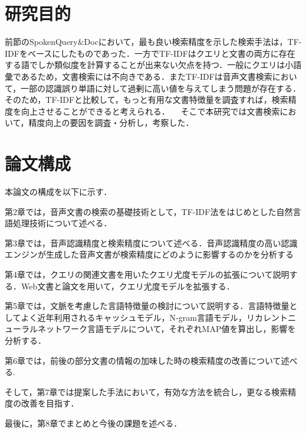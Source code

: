\section{研究目的}
前節のSpokenQuery\&Docにおいて，最も良い検索精度を示した検索手法は，TF-IDFをベースにしたものであった．一方でTF-IDFはクエリと文書の両方に存在する語でしか類似度を計算することが出来ない欠点を持つ．一般にクエリは小語彙であるため，文書検索には不向きである．またTF-IDFは音声文書検索において，一部の認識誤り単語に対して過剰に高い値を与えてしまう問題が存在する．そのため，TF-IDFと比較して，もっと有用な文書特徴量を調査すれば，検索精度を向上させることができると考えられる．
　そこで本研究では文書検索において，精度向上の要因を調査・分析し，考察した．

\section{論文構成}
\noindent
本論文の構成を以下に示す．

第2章では，音声文書の検索の基礎技術として，TF-IDF法をはじめとした自然言語処理技術について述べる．

第3章では，音声認識精度と検索精度について述べる．音声認識精度の高い認識エンジンが生成した音声文書が検索精度にどのように影響するのかを分析する 

第4章では，クエリの関連文書を用いたクエリ尤度モデルの拡張について説明する．Web文書と論文を用いて，クエリ尤度モデルを拡張する．

第5章では，文脈を考慮した言語特徴量の検討について説明する．言語特徴量としてよく近年利用されるキャッシュモデル，N-gram言語モデル，リカレントニューラルネットワーク言語モデルについて，それぞれMAP値を算出し，影響を分析する．

第6章では，前後の部分文書の情報の加味した時の検索精度の改善について述べる. 

そして，第7章では提案した手法において，有効な方法を統合し，更なる検索精度の改善を目指す． 

最後に，第8章でまとめと今後の課題を述べる．

